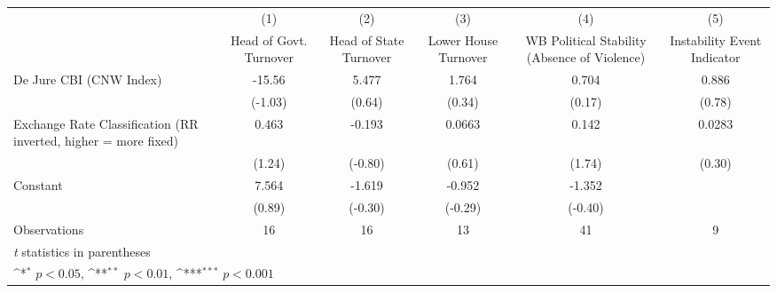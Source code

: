 {
\def\sym#1{\ifmmode^{#1}\else\(^{#1}\)\fi}
\begin{tabular*}{\linewidth}{@{\hskip\tabcolsep\extracolsep\fill}l*{5}{c}}
\hline\hline
                &\multicolumn{1}{c}{(1)}&\multicolumn{1}{c}{(2)}&\multicolumn{1}{c}{(3)}&\multicolumn{1}{c}{(4)}&\multicolumn{1}{c}{(5)}\\
                &\multicolumn{1}{c}{Head of Govt. Turnover}&\multicolumn{1}{c}{Head of State Turnover}&\multicolumn{1}{c}{Lower House Turnover}&\multicolumn{1}{c}{WB Political Stability (Absence of Violence)}&\multicolumn{1}{c}{Instability Event Indicator}\\
\hline
De Jure CBI (CNW Index)&   -15.56         &    5.477         &    1.764         &    0.704         &    0.886         \\
                &  (-1.03)         &   (0.64)         &   (0.34)         &   (0.17)         &   (0.78)         \\
[1em]
Exchange Rate Classification (RR inverted, higher = more fixed)&    0.463         &   -0.193         &   0.0663         &    0.142         &   0.0283         \\
                &   (1.24)         &  (-0.80)         &   (0.61)         &   (1.74)         &   (0.30)         \\
[1em]
Constant        &    7.564         &   -1.619         &   -0.952         &   -1.352         &                  \\
                &   (0.89)         &  (-0.30)         &  (-0.29)         &  (-0.40)         &                  \\
\hline
Observations    &       16         &       16         &       13         &       41         &        9         \\
\hline\hline
\multicolumn{6}{l}{\footnotesize \textit{t} statistics in parentheses}\\
\multicolumn{6}{l}{\footnotesize \sym{*} \(p<0.05\), \sym{**} \(p<0.01\), \sym{***} \(p<0.001\)}\\
\end{tabular*}
}
